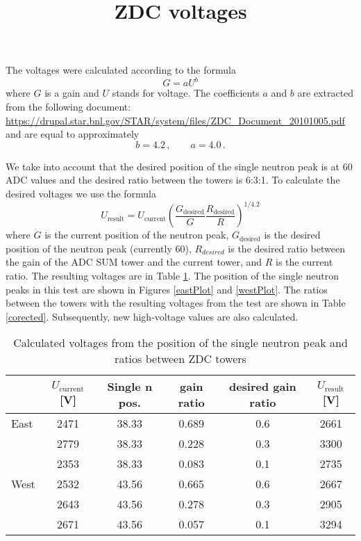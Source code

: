 \documentclass[a4paper,10pt]{article}
\title{ZDC voltages}
\author{}
\date{}
\begin{document}
\maketitle

The voltages were calculated according to the formula
$$
G = aU^b
$$
where $G$ is a gain and $U$ stands for voltage. The coefficients $a$ and $b$ are 
extracted from the following document:\\
\url{https://drupal.star.bnl.gov/STAR/system/files/ZDC_Document_20101005.pdf}\\
and are equal to approximately
\begin{equation}
b=4.2\,, \qquad a=4.0\,.
\end{equation}

We take into account that the desired position of the single neutron peak is at 60 ADC values
and the desired ratio between the towers is 6:3:1. To calculate the desired voltages we use the
formula
\begin{equation}
U_{\text{result}} = U_\text{current}\left(\frac{G_\text{desired}}{G} 
\frac{R_\text{desired}}{R}\right)^{1/4.2}
\end{equation}
where $G$ is the current position of the neutron peak, $G_\text{desired}$ is the desired position
of the neutron peak (currently 60), $R_{desired}$ is the desired ratio between the gain of the ADC SUM
tower and the current tower, and $R$ is the current ratio.
The resulting voltages are in Table \ref{uncorected}. The position of the single
neutron peaks in this test
are shown in Figures \ref{eastPlot} and \ref{westPlot}.
The ratios between the towers with the resulting voltages from the test
are shown in Table \ref{corected}.
Subsequently, new high-voltage values are also calculated.

\begin{table}[htb] 
\caption{Calculated voltages from the position of the single neutron peak and ratios 
between ZDC towers}
\label{uncorected}
\begin{center}
\begin{tabular}{lccccc}
 \toprule
 &$U_\text{current}$[V]&Single n pos.&gain ratio&desired gain ratio&$U_\text{result}$[V]\\
\midrule
 East&2471&38.33&0.689&0.6&2661\\
     &2779&38.33&0.228&0.3&3300\\
     &2353&38.33&0.083&0.1&2735\\
 \midrule
West&2532&43.56&0.665&0.6&2667\\
    &2643&43.56&0.278&0.3&2905\\
    &2671&43.56&0.057&0.1&3294\\
 \bottomrule
\end{tabular}
\end{center}
\end{table}
\end{document}
